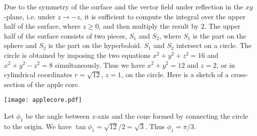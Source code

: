 \begin{solution} 
 Due to the symmetry of the surface and the vector field under reflection in the $xy$-plane, i.e. under $z\rightarrow -z$, it is sufficient
to compute the integral over the upper half of the surface, where $z \ge 0$,
and then multiply the result by 2. The upper half of the surface consists
of two pieces, $S_1$ and $S_2$, where $S_1$ is the part on the sphere and
$S_2$ is the part on the hyperboloid.
$S_1$ and $S_2$ intersect on a circle. The circle is obtained 
by imposing the two equations $x^2+y^2+z^2=16$ and $x^2+y^2-z^2=8$
simultaneously. Thus we have $x^2+y^2=12$ and $z=2$, or in cylindrical coordinates $r=\sqrt{12}$, $z=1$, on the circle. Here is a sketch of a 
cross-section of the apple core.
\begin{center}
    \texttt{[image: applecore.pdf]}
\end{center}
Let $\phi_1$ be the angle between $z$-axis and the cone formed by 
connecting the circle to the origin. We have $\tan \phi_1 = \sqrt {12}/2 = \sqrt 3$.  Thus $\phi_1 = \pi/3$.



\end{solution}
